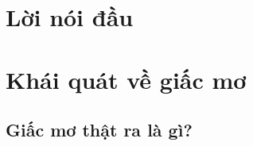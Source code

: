 \documentclass[twoside,a4paper]{report}
\begin{document}
\maketitle
\tableofcontents%
\thispagestyle{empty}%
\vfill
\pagebreak
\setcounter{page}{0}%


%
\chapter*{Lời nói đầu}



\chapter{Khái quát về giấc mơ}
\section{Giấc mơ thật ra là gì?}

\end{document}
